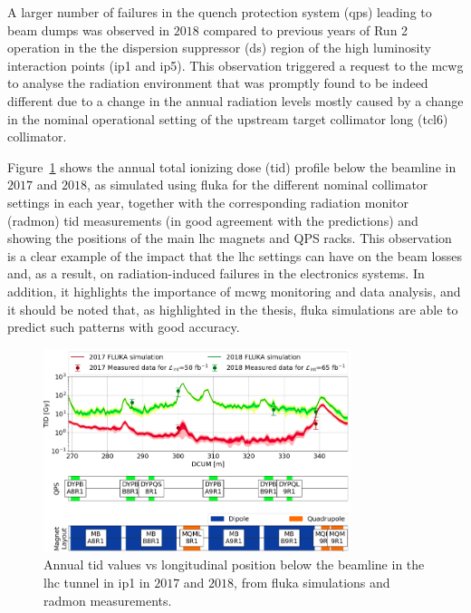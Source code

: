 \documentclass[encoding=utf8,british]{tumphthesis}
\begin{document}
A larger number of failures in the quench protection system (\acrshort{qps}) \cite{Coull:259538} leading to beam dumps was observed in $2018$ compared to previous years of Run 2 operation in the the dispersion suppressor (\acrshort{ds}) region of the high luminosity interaction points (\acrshort{ip}1 and \acrshort{ip}5). This observation triggered a request to the \acrshort{mcwg} to analyse the radiation environment that was promptly found to be indeed different due to a change in the annual radiation levels mostly caused by a change in the nominal operational setting of the upstream target collimator long (\acrshort{tcl}6) collimator. 


Figure~\ref{fig:2017_2018_DS_TID} shows the annual total ionizing dose (\acrshort{tid}) profile below the beamline in $2017$ and $2018$, as simulated using \acrshort{fluka} for the different nominal collimator settings in each year, together with the corresponding radiation monitor (\acrshort{radmon}) \acrshort{tid} measurements (in good agreement with the predictions) and showing the positions of the main \acrshort{lhc} magnets and QPS racks. This observation is a clear example of the impact that the \acrshort{lhc} settings can have on the beam losses and, as a result, on radiation-induced failures in the electronics systems. In addition, it highlights the importance of \acrshort{mcwg} monitoring and data analysis, and it should be noted that, as highlighted in the thesis, \acrshort{fluka} simulations are able to predict such patterns with good accuracy.


\begin{figure}[H]
   \centering
   \includegraphics[width=0.8\textwidth]{results/QPS_region_RadMONs_TID.png}
   \caption{Annual \acrshort{tid} values vs longitudinal position below the beamline in the \acrshort{lhc} tunnel in \acrshort{ip}1 in $2017$ and $2018$, from \acrshort{fluka} simulations and \acrshort{radmon} measurements.}
   \label{fig:2017_2018_DS_TID}
\end{figure}
\end{document}
